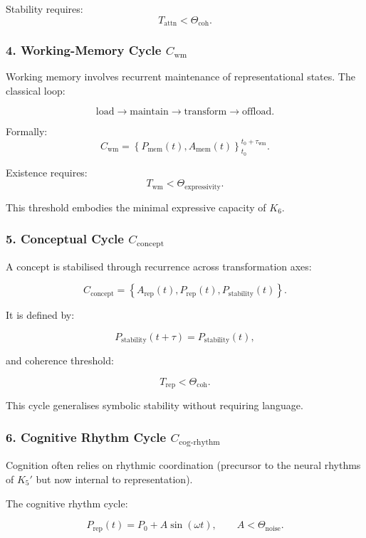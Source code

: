 Stability requires:
\[
  T_{\mathrm{attn}} < \Theta_{\mathrm{coh}}.
\]

\subsubsection{4. Working-Memory Cycle $C_{\mathrm{wm}}$}

Working memory involves recurrent maintenance of representational states.
The classical loop:

\[
 \mathrm{load}
 \to
 \mathrm{maintain}
 \to
 \mathrm{transform}
 \to
 \mathrm{offload}.
\]

Formally:
\[
 C_{\mathrm{wm}} =
 \left\{
   P_{\mathrm{mem}}(t), A_{\mathrm{mem}}(t)
 \right\}_{t_0}^{t_0+\tau_{\mathrm{wm}}}.
\]

Existence requires:
\[
 T_{\mathrm{wm}} < \Theta_{\mathrm{expressivity}}.
\]

This threshold embodies the minimal expressive capacity of $K_6$.

\subsubsection{5. Conceptual Cycle $C_{\mathrm{concept}}$}

A concept is stabilised through recurrence across transformation axes:

\[
  C_{\mathrm{concept}}
    = \left\{
      A_{\mathrm{rep}}(t),
      P_{\mathrm{rep}}(t),
      P_{\mathrm{stability}}(t)
    \right\}.
\]

It is defined by:

\[
  P_{\mathrm{stability}}(t+\tau) = P_{\mathrm{stability}}(t),
\]

and coherence threshold:

\[
  T_{\mathrm{rep}} < \Theta_{\mathrm{coh}}.
\]

This cycle generalises symbolic stability without requiring language.

\subsubsection{6. Cognitive Rhythm Cycle $C_{\mathrm{cog\text{-}rhythm}}$}

Cognition often relies on rhythmic coordination (precursor to the
neural rhythms of $K_5'$ but now internal to representation).

The cognitive rhythm cycle:

\[
 P_{\mathrm{rep}}(t) = P_0 + A\sin(\omega t),\qquad
 A < \Theta_{\mathrm{noise}}.
\]

